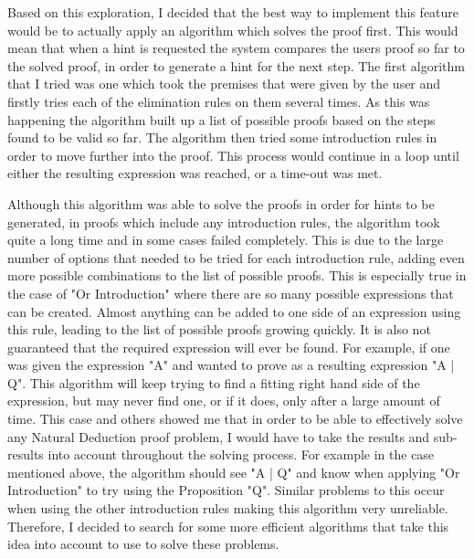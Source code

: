 Based on this exploration, I decided that the best way to implement this feature would be to actually apply an algorithm which solves the proof first. This would mean that when a hint is requested the system compares the users proof so far to the solved proof, in order to generate a hint for the next step. The first algorithm that I tried was one which took the premises that were given by the user and firstly tries each of the elimination rules on them several times. As this was happening the algorithm built up a list of possible proofs based on the steps found to be valid so far. The algorithm then tried some introduction rules in order to move further into the proof. This process would continue in a loop until either the resulting expression was reached, or a time-out was met. 

Although this algorithm was able to solve the proofs in order for hints to be generated, in proofs which include any introduction rules, the algorithm took quite a long time and in some cases failed completely. This is due to the large number of options that needed to be tried for each introduction rule, adding even more possible combinations to the list of possible proofs. This is especially true in the case of "Or Introduction" where there are so many possible expressions that can be created. Almost anything can be added to one side of an expression using this rule, leading to the list of possible proofs growing quickly. It is also not guaranteed that the required expression will ever be found. For example, if one was given the expression "A" and wanted to prove as a resulting expression "A | Q". This algorithm will keep trying to find a fitting right hand side of the expression, but may never find one, or if it does, only after a large amount of time. This case and others showed me that in order to be able to effectively solve any Natural Deduction proof problem, I would have to take the results and sub-results into account throughout the solving process. For example in the case mentioned above, the algorithm should see "A | Q" and know when applying "Or Introduction" to try using the Proposition "Q". Similar problems to this occur when using the other introduction rules making this algorithm very unreliable. Therefore, I decided to search for some more efficient algorithms that take this idea into account to use to solve these problems.

